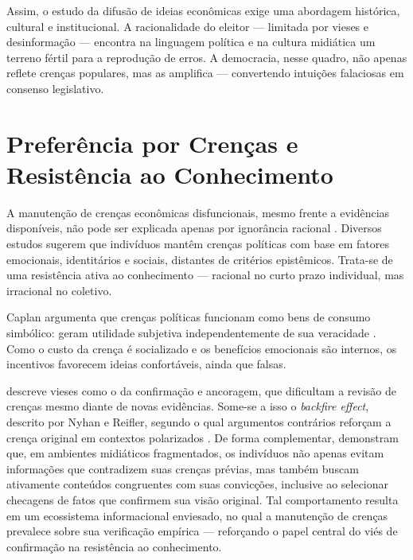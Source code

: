 Assim, o estudo da difusão de ideias econômicas exige uma abordagem histórica, cultural e institucional. A racionalidade do eleitor — limitada por vieses e desinformação — encontra na linguagem política e na cultura midiática um terreno fértil para a reprodução de erros. A democracia, nesse quadro, não apenas reflete crenças populares, mas as amplifica — convertendo intuições falaciosas em consenso legislativo.


\section{Preferência por Crenças e Resistência ao Conhecimento}

A manutenção de crenças econômicas disfuncionais, mesmo frente a evidências disponíveis, não pode ser explicada apenas por ignorância racional \cite{downs1957economic}. Diversos estudos sugerem que indivíduos mantêm crenças políticas com base em fatores emocionais, identitários e sociais, distantes de critérios epistêmicos. Trata-se de uma resistência ativa ao conhecimento — racional no curto prazo individual, mas irracional no coletivo.

Caplan argumenta que crenças políticas funcionam como bens de consumo simbólico: geram utilidade subjetiva independentemente de sua veracidade \cite{The_Myth_of_the_Rational_Voter}. Como o custo da crença é socializado e os benefícios emocionais são internos, os incentivos favorecem ideias confortáveis, ainda que falsas.

 descreve vieses como o da confirmação e ancoragem, que dificultam a revisão de crenças mesmo diante de novas evidências. Some-se a isso o \textit{backfire effect}, descrito por Nyhan e Reifler, segundo o qual argumentos contrários reforçam a crença original em contextos polarizados \cite{nyhan2010when}. De forma complementar,  demonstram que, em ambientes midiáticos fragmentados, os indivíduos não apenas evitam informações que contradizem suas crenças prévias, mas também buscam ativamente conteúdos congruentes com suas convicções, inclusive ao selecionar checagens de fatos que confirmem sua visão original. Tal comportamento resulta em um ecossistema informacional enviesado, no qual a manutenção de crenças prevalece sobre sua verificação empírica — reforçando o papel central do viés de confirmação na resistência ao conhecimento.

